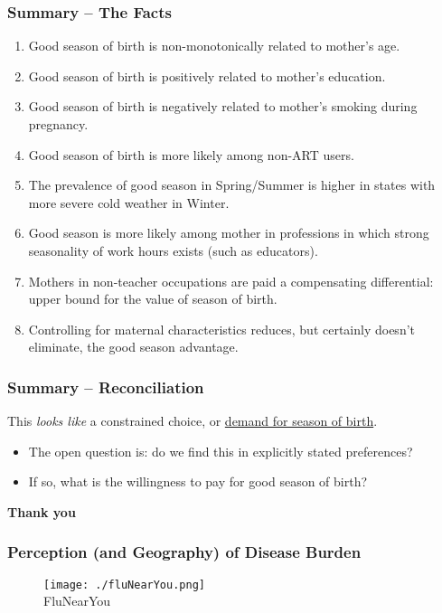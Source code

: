 \documentclass[10pt,letterpaper,subeqn]{beamer}
\begin{document}
\begin{frame}[label=conclusions]
\frametitle{Summary -- The Facts}
\begin{enumerate}
\item Good season of birth is non-monotonically related to mother's age.
\item Good season of birth is positively related to mother's education.
\item Good season of birth is negatively related to mother's smoking during pregnancy.
\item Good season of birth is more likely among non-ART users.
\item The prevalence of good season in Spring/Summer is higher in states with more severe cold weather in Winter.
\item Good season is more likely among mother in professions in which strong seasonality of work hours exists (such as educators).
\item Mothers in non-teacher occupations are paid a compensating differential: upper bound for the value of season of birth.
\item Controlling for maternal characteristics reduces, but certainly doesn't eliminate, the good season advantage.
\end{enumerate}
\end{frame}

\begin{frame}[label=conclusions2]
\frametitle{Summary -- Reconciliation}
This \emph{looks like} a constrained choice, or \underline{demand for season of birth}.
\vspace{3mm} \\
\begin{itemize}
\item The open question is: do we find this in explicitly stated preferences?
\item If so, what is the willingness to pay for good season of birth?
\end{itemize}
\end{frame}


\begin{frame}
  \begin{center}
    \textbf{Thank you}
  \end{center}
\end{frame}

\begin{frame}[label=flu]
\frametitle{Perception (and Geography) of Disease Burden}
\begin{figure}[htpb!]
  \centering
  \texttt{[image: ./fluNearYou.png]} \\
{\footnotesize FluNearYou}
\end{figure}
\hyperlink{perceptions}{}
\end{frame}
\end{document}
